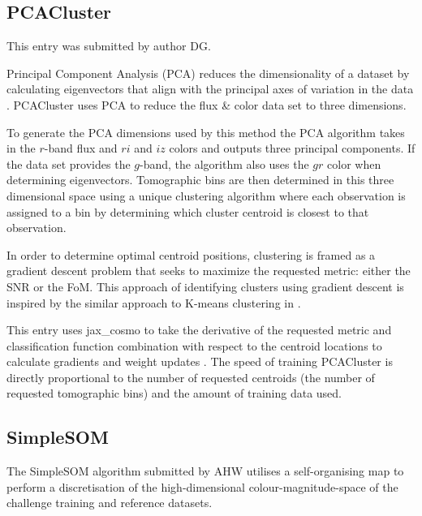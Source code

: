 \documentclass[twocolumn,twocolappendix]{aastex63}
\begin{document}
\subsection{ {\sc PCACluster} }
This entry was submitted by author DG.

Principal Component Analysis (PCA) reduces the dimensionality of a dataset by
calculating eigenvectors that align with the principal axes of variation in the
data \citep{doi:10.1098}. {\sc PCACluster} uses PCA to reduce the flux \& color
data set to three dimensions. 

To generate the PCA dimensions used by this method the PCA algorithm takes in
the $r$-band flux and $ri$ and $iz$ colors and outputs three principal
components.  If the data set provides the $g$-band, the algorithm also uses the
$gr$ color when determining eigenvectors. Tomographic bins are then determined
in this three dimensional space using a unique clustering algorithm where each
observation is assigned to a bin by determining which cluster centroid is
closest to that observation.

In order to determine optimal centroid positions, clustering is framed as a
gradient descent problem that seeks to maximize the requested metric: either the
SNR or the FoM. This approach of identifying clusters using gradient descent is
inspired by the similar approach to K-means clustering in
\citet{NIPS1994_a1140a3d}.

This entry uses {\sc jax\_cosmo} to take the derivative of the requested metric
and classification function combination with respect to the centroid locations
to calculate gradients and weight updates \citep{jax-cosmo}.  The speed of
training PCACluster is directly proportional to the number of requested
centroids (the number of requested tomographic bins) and the amount of training
data used.


\subsection{ {\sc SimpleSOM} }
The SimpleSOM algorithm submitted by AHW utilises a self-organising map
\citep[SOM,][]{Kohonen:1982} to perform  a discretisation of the
high-dimensional colour-magnitude-space of the challenge training and reference
datasets. 
\end{document}
